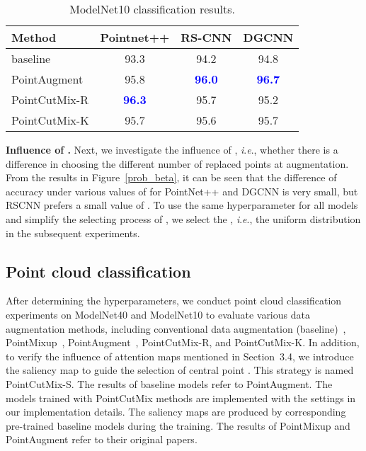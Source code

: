 \documentclass{article}
\newcommand{\ie}{\textit{i}.\textit{e}.}
\begin{document}
\begin{table}[tp]
\centering
\setlength{\tabcolsep}{1.8mm}
\caption{ModelNet10 classification results.}
\label{mn10result}
\vspace{1mm}
\begin{tabular}{l c c c}
\toprule
Method & Pointnet++ & RS-CNN & DGCNN \\
\midrule
baseline &93.3 & 94.2 & 94.8
\\
PointAugment & 95.8 & \textcolor{blue}{\textbf{96.0}} & \textcolor{blue}{\textbf{96.7}}
\\
\midrule
PointCutMix-R & \textcolor{blue}{\textbf{96.3}}  & 95.7  &  95.2
\\
PointCutMix-K & 95.7 & 95.6 & 95.7
\\
\bottomrule
\end{tabular}
\end{table}








\textbf{Influence of .} Next, we investigate the influence of , \ie, whether there is a difference in choosing the different number of replaced points at augmentation. From the results in Figure~\ref{prob_beta}, it can be seen that the difference of accuracy under various values of  for PointNet++ and DGCNN is very small, but RSCNN prefers a small value of . To use the same hyperparameter for all models and simplify the selecting process of , we select the , \ie, the uniform distribution in the subsequent experiments.

\subsection{Point cloud classification}

After determining the hyperparameters, we conduct point cloud classification experiments on ModelNet40 and ModelNet10 to evaluate various data augmentation methods, including conventional data augmentation (baseline)~\cite{pointnet++}, PointMixup~\cite{pointmixup}, PointAugment~\cite{pointaugment}, PointCutMix-R, and PointCutMix-K. In addition, to verify the influence of attention maps mentioned in Section~3.4, we introduce the saliency map to guide the selection of central point . This strategy is named PointCutMix-S.
The results of baseline models refer to PointAugment. The models trained with PointCutMix methods are implemented with the settings in our implementation details. The saliency maps are produced by corresponding pre-trained baseline models during the training. The results of PointMixup and PointAugment refer to their original papers. 
\end{document}
